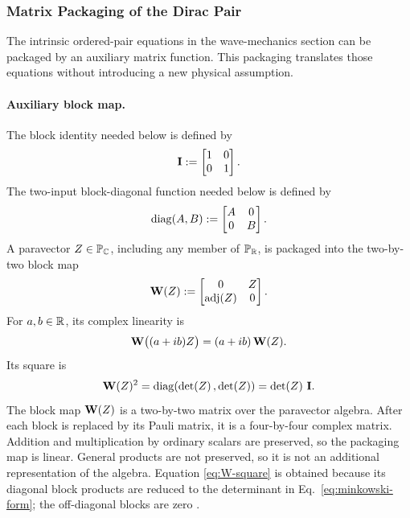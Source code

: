 \subsubsection{Matrix Packaging of the Dirac Pair}
\label{sec:matrix-dirac-packaging}
The intrinsic ordered-pair equations in the wave-mechanics section can be
packaged by an auxiliary matrix function. This packaging translates those
equations without introducing a new physical assumption.

\paragraph{Auxiliary block map.}
The block identity needed below is defined by
\begin{equation}
\mathbf{I}:=
\begin{bmatrix}
1&0\\
0&1
\end{bmatrix}.
\label{eq:W-block-identity}
\end{equation}
The two-input block-diagonal function needed below is defined by
\begin{equation}
\operatorname{diag}(A,B):=
\begin{bmatrix}
A&0\\
0&B
\end{bmatrix}.
\label{eq:W-block-diag}
\end{equation}
A paravector \(Z\in\mathbb{P}_{\mathbb{C}}\), including any member of
\(\mathbb{P}_{\mathbb{R}}\), is packaged into the two-by-two block map
\begin{equation}
\mathbf{W}(Z):=
\begin{bmatrix}
0&Z\\
\operatorname{adj}\!\left(Z\right)&0
\end{bmatrix}.
\label{eq:W-map}
\end{equation}
For \(a,b\in\mathbb{R}\), its complex linearity is
\begin{equation}
\mathbf{W}\bigl((a+ib)Z\bigr)
=(a+ib)\,\mathbf{W}(Z).
\label{eq:W-linearity}
\end{equation}
Its square is
\begin{equation}
\mathbf{W}(Z)^2
=\operatorname{diag}(\operatorname{det}\!\left(Z\right),\operatorname{det}\!\left(Z\right))
=\operatorname{det}\!\left(Z\right)\,\mathbf{I}.
\label{eq:W-square}
\end{equation}
The block map \(\mathbf{W}(Z)\) is a two-by-two matrix over the paravector
algebra. After each block is replaced by its Pauli matrix, it is a
four-by-four complex matrix. Addition and multiplication by ordinary
scalars are preserved, so the packaging map is linear. General products are
not preserved, so it is not an additional representation of the algebra.
Equation \eqref{eq:W-square} is obtained because its
diagonal block products are reduced to the determinant in
Eq.\ \eqref{eq:minkowski-form}; the off-diagonal blocks are zero
\cite{hestenes1966,doran2003}.

